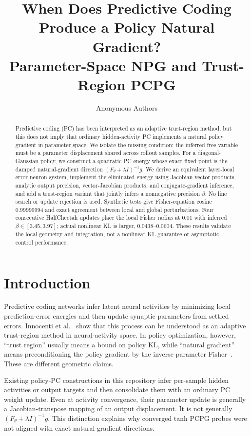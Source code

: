 \documentclass{article}
\title{When Does Predictive Coding Produce a Policy Natural Gradient?\\
Parameter-Space NPG and Trust-Region PCPG}
\author{Anonymous Authors}
\newcommand{\Fpol}{F_{\theta}}
\begin{document}
\maketitle

\begin{abstract}
Predictive coding (PC) has been interpreted as an adaptive trust-region method, but this does not imply that ordinary hidden-activity PC implements a natural policy gradient in parameter space. We isolate the missing condition: the inferred free variable must be a parameter displacement shared across rollout samples. For a diagonal-Gaussian policy, we construct a quadratic PC energy whose exact fixed point is the damped natural-gradient direction $(\Fpol+\lambda I)^{-1}g$. We derive an equivalent layer-local error-neuron system, implement the eliminated energy using Jacobian-vector products, analytic output precision, vector-Jacobian products, and conjugate-gradient inference, and add a trust-region variant that jointly infers a nonnegative precision $\beta$. No line search or update rejection is used. Synthetic tests give Fisher-equation cosine $0.99999994$ and exact agreement between local and global perturbations. Four consecutive HalfCheetah updates place the local Fisher radius at $0.01$ with inferred $\beta\in[3.45,3.97]$; actual nonlinear KL is larger, $0.0438$--$0.0604$. These results validate the local geometry and integration, not a nonlinear-KL guarantee or asymptotic control performance.
\end{abstract}

\section{Introduction}

Predictive coding networks infer latent neural activities by minimizing local prediction-error energies and then update synaptic parameters from settled errors. Innocenti et al.~\citep{innocenti2023} show that this process can be understood as an adaptive trust-region method in neural-activity space. In policy optimization, however, ``trust region'' usually means a bound on policy KL, while ``natural gradient'' means preconditioning the policy gradient by the inverse parameter Fisher~\citep{kakade2001,schulman2015}. These are different geometric claims.

Existing policy-PC constructions in this repository infer per-sample hidden activities or output targets and then consolidate them with an ordinary PC weight update. Even at activity convergence, their parameter update is generally a Jacobian-transpose mapping of an output displacement. It is not generally $(\Fpol+\lambda I)^{-1}g$. This distinction explains why converged tanh PCPG probes were not aligned with exact natural-gradient directions.
\end{document}

